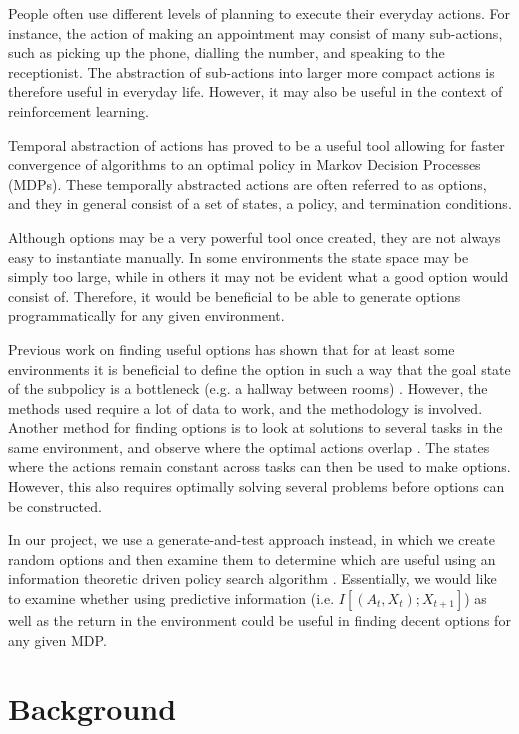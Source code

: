 \documentclass{acm_proc_article-sp}
\begin{document}
People often use different levels of planning to execute their everyday actions. For instance, the action of making an appointment may consist of many sub-actions, such as picking up the phone, dialling the number, and speaking to the receptionist. The abstraction of sub-actions into larger more compact actions is therefore useful in everyday life. However, it may also be useful in the context of reinforcement learning.

Temporal abstraction of actions has proved to be a useful tool allowing for faster convergence of algorithms to an optimal policy in Markov Decision Processes (MDPs). These temporally abstracted actions are often referred to as options, and they in general consist of a set of states, a policy, and termination conditions. 

Although options may be a very powerful tool once created, they are not always easy to instantiate manually. In some environments the state space may be simply too large, while in others it may not be evident what a good option would consist of. Therefore, it would be beneficial to be able to generate options programmatically for any given environment.

Previous work on finding useful options has shown that for at least some environments it is beneficial to define the option in such a way that the goal state of the subpolicy is a bottleneck (e.g. a hallway between rooms) \cite{solwayoptimal}. However, the methods used require a lot of data to work, and the methodology is involved. Another method for finding options is to look at solutions to several tasks in the same environment, and observe where the optimal actions overlap \cite{pickett2002policyblocks}. The states where the actions remain constant across tasks can then be used to make options. However, this also requires optimally solving several problems before options can be constructed.

In our project, we use a generate-and-test approach instead, in which we create random options and then examine them to determine which are useful using an information theoretic driven policy search algorithm \cite{still}. Essentially, we would like to examine whether using predictive information (i.e. $I[(A_t,X_t); X_{t+1}]$) as well as the return in the environment could be useful in finding decent options for any given MDP.

\section{Background} 
\end{document}
